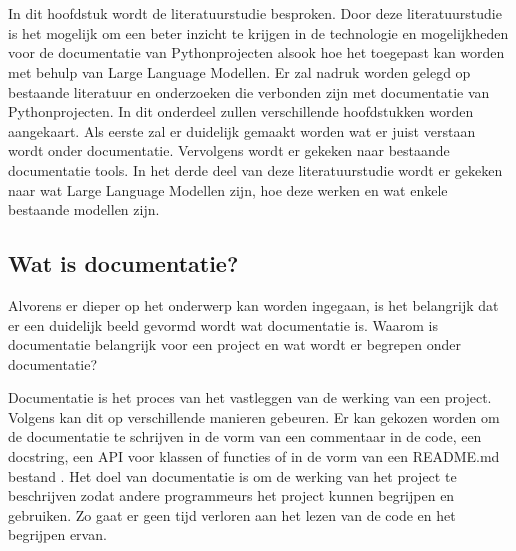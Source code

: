 \chapter{}%
\label{ch:stand-van-zaken}



In dit hoofdstuk wordt de literatuurstudie besproken. 
Door deze literatuurstudie is het mogelijk om een beter inzicht te krijgen in de technologie en mogelijkheden voor de documentatie van Pythonprojecten alsook hoe het toegepast kan worden met behulp van Large Language Modellen. 
Er zal nadruk worden gelegd op bestaande literatuur en onderzoeken die verbonden zijn met documentatie van Pythonprojecten. 
In dit onderdeel zullen verschillende hoofdstukken worden aangekaart. 
Als eerste zal er duidelijk gemaakt worden wat er juist verstaan wordt onder documentatie. 
Vervolgens wordt er gekeken naar bestaande documentatie tools.
In het derde deel van deze literatuurstudie wordt er gekeken naar wat Large Language Modellen zijn, hoe deze werken en wat enkele bestaande modellen zijn.

\section{Wat is documentatie?}
\label{sec:wat-is-documentatie}

Alvorens er dieper op het onderwerp kan worden ingegaan, is het belangrijk dat er een duidelijk beeld gevormd wordt wat documentatie is. 
Waarom is documentatie belangrijk voor een project en wat wordt er begrepen onder documentatie? 

Documentatie is het proces van het vastleggen van de werking van een project.
Volgens \textcite{CodeQuality2024} kan dit op verschillende manieren gebeuren. 
Er kan gekozen worden om de documentatie te schrijven in de vorm van een commentaar in de code, een docstring, een API voor klassen of functies of in de vorm van een README.md bestand \autocite{CodeQuality2024}.
Het doel van documentatie is om de werking van het project te beschrijven zodat andere programmeurs het project kunnen begrijpen en gebruiken.
Zo gaat er geen tijd verloren aan het lezen van de code en het begrijpen ervan.

